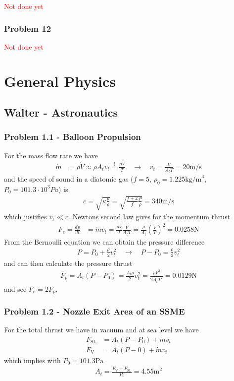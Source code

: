 \documentclass[10pt,a4paper]{article}
\theoremstyle{definition}
\begin{document}
\textcolor{red}{Not done yet}
\subsubsection{Problem 12}
\textcolor{red}{Not done yet}


\section{General Physics}
\subsection{{\sc Walter} - Astronautics}
\subsubsection{Problem 1.1 - Balloon Propulsion}
For the mass flow rate we have
\begin{align}
    \dot{m}&=\rho\dot{V}\approx\rho A_t v_t \stackrel{!}{=} \frac{\rho V}{T}\quad\rightarrow\quad v_t=\frac{V}{A_tT}=20\text{m/s}
\end{align}
and the speed of sound in a diatomic gas ($f=5$, $\rho_0=1.225\text{kg/m}^3$, $P_0=101.3\cdot10^3Pa$) is
\begin{align}
    c=\sqrt{\kappa\frac{p}{\rho}}=\sqrt{\frac{f+2}{f}\frac{P}{\rho}}=340\text{m/s}
\end{align}
which justifies $v_t\ll c$. Newtons second law gives for the momentum thrust
\begin{align}
    F_e=\frac{dp}{dt}&=\dot{m}v_t=\frac{\rho V}{T}\frac{V}{A_t T}=\frac{\rho}{A_t}\left(\frac{V}{T}\right)^2=0.0258\text{N}
\end{align}
From the Bernoulli equation we can obtain the pressure difference
\begin{align}
    P = P_0+\frac{\rho}{2}v_t^2\quad\rightarrow\quad P - P_0=\frac{\rho}{2}v_t^2
\end{align}
and can then calculate the pressure thrust
\begin{align}
    F_p=A_t(P-P_0)=\frac{A_t\rho}{2}v_t^2=\frac{\rho V^2}{2A_tT^2}=0.0129\text{N}
\end{align}
and see $F_e=2F_p$.


\subsubsection{Problem 1.2 - Nozzle Exit Area of an SSME}
For the total thrust we have in vacuum and at sea level we have
\begin{align}
    F_\text{SL}&=A_t(P-P_0) + \dot{m}v_t\\
    F_\text{V}&=A_t(P-0) + \dot{m}v_t
\end{align}
which implies with $P_0=101.3\text{Pa}$
\begin{align}
    A_t=\frac{F_\text{V}-F_\text{SL}}{P_0}=4.55\text{m}^2
\end{align}
\end{document}
